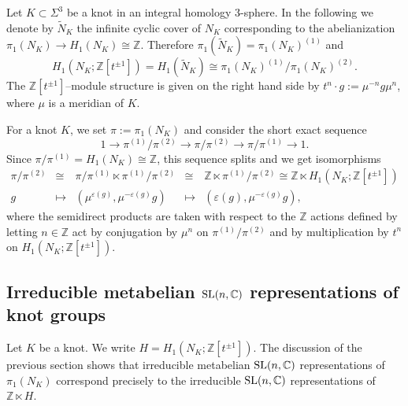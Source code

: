 \documentclass[12pt]{amsart}
\theoremstyle{plain}
\theoremstyle{remark}
\begin{document}
Let $K\subset {\Sigma}^3$ be a knot in an integral homology 3-sphere.
In the following we denote by $\widetilde{N}_K$
the infinite cyclic cover of $N_K$ corresponding to the abelianization $\pi_1(N_K)\to H_1(N_K) \cong {{\mathbb Z}}$.
Therefore $\pi_1(\widetilde{N}_K)=\pi_1(N_K)^{(1)}$ and
$$ H_1(N_K;{{\mathbb Z}}[t^{\pm 1}])=H_1(\widetilde{N}_K) \cong \pi_1(N_K)^{(1)}/\pi_1(N_K)^{(2)}.$$
The ${{\mathbb Z}}[t^{\pm 1}]$--module structure is
given on the right hand side
by $t^n\cdot g:=\mu^{-n}g\mu^n$, where $\mu$ is a meridian
of $K$.

For a knot $K$, we set $\pi:=\pi_1(N_K)$ and consider the short exact sequence
$$ 1\to \pi^{(1)}/\pi^{(2)}\to \pi/\pi^{(2)}\to\pi/\pi^{(1)}\to 1. $$
Since $\pi/\pi^{(1)}=H_1(N_K)\cong {{\mathbb Z}}$, this sequence splits and we get isomorphisms
$$ \begin{array}{rcccl} \pi/\pi^{(2)}
&\cong & \pi/\pi^{(1)} \ltimes \pi^{(1)}/\pi^{(2)}
&\cong &{{\mathbb Z}} \ltimes \pi^{(1)}/\pi^{(2)}   \cong {{\mathbb Z}} \ltimes H_1(N_K;{{\mathbb Z}}[t^{\pm 1}]) \\
    g &\mapsto &(\mu^{{\varepsilon}(g)},\mu^{-{\varepsilon}(g)}g) &\mapsto &({\varepsilon}(g),\mu^{-{\varepsilon}(g)}g), \end{array}  $$
where the semidirect products are taken with respect to the ${{\mathbb Z}}$ actions defined by
letting $n \in {{\mathbb Z}}$ act by conjugation by $\mu^n$ on $\pi^{(1)}/\pi^{(2)}$ and by multiplication
by $t^n$ on $H_1(N_K; {{\mathbb Z}}[t^{\pm1}])$.

\subsection{Irreducible metabelian ${{\rm SL}}(n, {{\mathbb C}})$ representations of knot groups}
\label{sec2-3}
Let $K$ be a knot. We write $H=H_1(N_K;{{\mathbb Z}}[t^{\pm 1}])$.
The discussion of the previous section shows that irreducible metabelian ${{\rm SL}}(n,{{\mathbb C}})$ representations of $\pi_1(N_K)$ correspond precisely to the irreducible  ${{\rm SL}}(n,{{\mathbb C}})$ representations of ${{\mathbb Z}}\ltimes H$.
\end{document}

